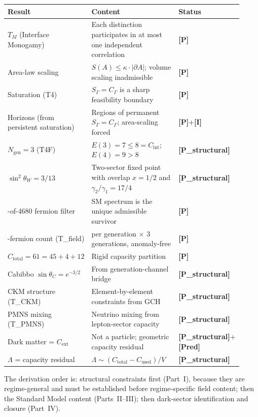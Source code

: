 \documentclass[11pt]{article}
\newcommand{\epitag}[1]{\textbf{[#1]}}
\theoremstyle{definition}
\begin{document}
\begin{center}\small
\begin{tabular}{@{}>{\raggedright\arraybackslash}p{0.30\linewidth} >{\raggedright\arraybackslash}p{0.42\linewidth} >{\raggedright\arraybackslash}p{0.20\linewidth}@{}}
\toprule
\textbf{Result} & \textbf{Content} & \textbf{Status} \\
\midrule
$T_M$ (Interface Monogamy) & Each distinction participates in at most one independent correlation & \epitag{P} \\
Area-law scaling & $S(A) \leq \kappa \cdot |\partial A|$; volume scaling inadmissible & \epitag{P} \\
Saturation (T4) & $S_\Gamma = C_\Gamma$ is a sharp feasibility boundary & \epitag{P} \\
Horizons (from persistent saturation) & Regions of permanent $S_\Gamma = C_\Gamma$; area-scaling forced & \epitag{P}+\epitag{I} \\
$N_{\mathrm{gen}} = 3$ (T4F) & $E(3) = 7 \leq 8 = C_{\mathrm{int}}$; $E(4) = 9 > 8$ & \epitag{P\_structural} \\
$\sin^2\theta_W = 3/13$ & Two-sector fixed point with overlap $x = 1/2$ and $\gamma_2/\gamma_1 = 17/4$ & \epitag{P\_structural} \\
1-of-4680 fermion filter & SM spectrum is the unique admissible survivor & \epitag{P} \\
45-fermion count (T\_field) & 15 per generation $\times$ 3 generations, anomaly-free & \epitag{P} \\
$C_{\mathrm{total}} = 61 = 45 + 4 + 12$ & Rigid capacity partition & \epitag{P} \\
Cabibbo $\sin\theta_C = e^{-3/2}$ & From generation-channel bridge & \epitag{P\_structural} \\
CKM structure (T\_CKM) & Element-by-element constraints from GCH & \epitag{P\_structural} \\
PMNS mixing (T\_PMNS) & Neutrino mixing from lepton-sector capacity & \epitag{P\_structural} \\
Dark matter = $C_{\mathrm{ext}}$ & Not a particle; geometric capacity residual & \epitag{P\_structural}+\epitag{Pred} \\
$\Lambda$ = capacity residual & $\Lambda \sim (C_{\mathrm{total}} - C_{\mathrm{used}}) / V$ & \epitag{P\_structural} \\
\bottomrule
\end{tabular}
\end{center}

The derivation order is: structural constraints first (Part~I), because they are regime-general and must be established before regime-specific field content; then the Standard Model content (Parts~II--III); then dark-sector identification and closure (Part~IV).
\end{document}
